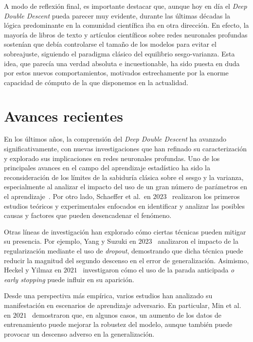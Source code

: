 A modo de reflexión final, es importante destacar que, aunque hoy en día el \textit{Deep Double Descent} pueda parecer muy evidente, durante las últimas décadas la lógica predominante en la comunidad científica iba en otra dirección. En efecto, la mayoría de libros de texto y artículos científicos sobre redes neuronales profundas sostenían que debía controlarse el tamaño de los modelos para evitar el sobreajuste, siguiendo el paradigma clásico del equilibrio sesgo-varianza. Esta idea, que parecía una verdad absoluta e incuestionable, ha sido puesta en duda por estos nuevos comportamientos, motivados estrechamente por la enorme capacidad de cómputo de la que disponemos en la actualidad.

\section{Avances recientes}\label{}

En los últimos años, la comprensión del \textit{Deep Double Descent} ha avanzado significativamente, con nuevas investigaciones que han refinado su caracterización y explorado sus implicaciones en redes neuronales profundas. Uno de los principales avances en el campo del aprendizaje estadístico ha sido la reconsideración de los límites de la sabiduría clásica sobre el sesgo y la varianza, especialmente al analizar el impacto del uso de un gran número de parámetros en el aprendizaje~\cite{Zhang2021,Curth2023}. Por otro lado, Schaeffer et al.\ en $2023$~\cite{Schaeffer2023} realizaron los primeros estudios teóricos y experimentales enfocados en identificar y analizar las posibles causas y factores que pueden desencadenar el fenómeno.

Otras líneas de investigación han explorado cómo ciertas técnicas pueden mitigar su presencia. Por ejemplo, Yang y Suzuki en $2023$~\cite{Yang2024} analizaron el impacto de la regularización mediante el uso de \textit{dropout}, demostrando que dicha técnica puede reducir la magnitud del segundo descenso en el error de generalización. Asimismo, Heckel y Yilmaz en $2021$~\cite{Heckel2020} investigaron cómo el uso de la parada anticipada \emph{o early stopping} puede influir en su aparición.

Desde una perspectiva más empírica, varios estudios han analizado su manifestación en escenarios de aprendizaje adversario. En particular, Min et al. en $2021$~\cite{Ming2020} demostraron que, en algunos casos, un aumento de los datos de entrenamiento puede mejorar la robustez del modelo, aunque también puede provocar un descenso adverso en la generalización.

